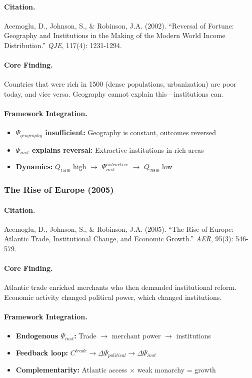 \paragraph{Citation.}
Acemoglu, D., Johnson, S., \& Robinson, J.A. (2002).
``Reversal of Fortune: Geography and Institutions in the Making of the
Modern World Income Distribution.'' \emph{QJE}, 117(4): 1231-1294.

\paragraph{Core Finding.}
Countries that were rich in 1500 (dense populations, urbanization)
are poor today, and vice versa. Geography cannot explain this---institutions can.

\paragraph{Framework Integration.}
\begin{itemize}
  \item \textbf{$\Psi_{geography}$ insufficient:} Geography is constant, outcomes reversed
  \item \textbf{$\Psi_{inst}$ explains reversal:} Extractive institutions in rich areas
  \item \textbf{Dynamics:} $Q_{1500}$ high $\to$ $\Psi_{inst}^{extractive}$ $\to$ $Q_{2000}$ low
\end{itemize}

\subsubsection{The Rise of Europe (2005)}

\paragraph{Citation.}
Acemoglu, D., Johnson, S., \& Robinson, J.A. (2005).
``The Rise of Europe: Atlantic Trade, Institutional Change, and Economic Growth.''
\emph{AER}, 95(3): 546-579.

\paragraph{Core Finding.}
Atlantic trade enriched merchants who then demanded institutional reform.
Economic activity changed political power, which changed institutions.

\paragraph{Framework Integration.}
\begin{itemize}
  \item \textbf{Endogenous $\Psi_{inst}$:} Trade $\to$ merchant power $\to$ institutions
  \item \textbf{Feedback loop:} $C^{trade} \to \Delta\Psi_{political} \to \Delta\Psi_{inst}$
  \item \textbf{Complementarity:} Atlantic access $\times$ weak monarchy = growth
\end{itemize}

